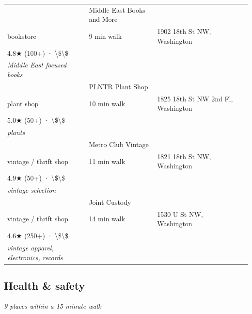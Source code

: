 \documentclass[11pt,a4paper]{article}
\begin{document}
{\begin{longtable}{@{}p{0.5cm}p{6.5cm}p{2.5cm}p{6.5cm}@{}}
\addlinespace[2pt]
12 & Middle East Books and More \\ \textcolor{brandmuted}{\footnotesize bookstore} & 9 min walk & \textcolor{brandmuted}{\footnotesize 1902 18th St NW,  Washington} \\ 4.8★ (100+) · \textbackslash{}\$\textbackslash{}\$ \\ \textit{Middle East focused books} \\
\addlinespace[2pt]
13 & PLNTR Plant Shop \\ \textcolor{brandmuted}{\footnotesize plant shop} & 10 min walk & \textcolor{brandmuted}{\footnotesize 1825 18th St NW 2nd Fl,  Washington} \\ 5.0★ (50+) · \textbackslash{}\$\textbackslash{}\$ \\ \textit{plants} \\
\addlinespace[2pt]
14 & Metro Club Vintage \\ \textcolor{brandmuted}{\footnotesize vintage / thrift shop} & 11 min walk & \textcolor{brandmuted}{\footnotesize 1821 18th St NW,  Washington} \\ 4.9★ (50+) · \textbackslash{}\$\textbackslash{}\$ \\ \textit{vintage selection} \\
\addlinespace[2pt]
15 & Joint Custody \\ \textcolor{brandmuted}{\footnotesize vintage / thrift shop} & 14 min walk & \textcolor{brandmuted}{\footnotesize 1530 U St NW,  Washington} \\ 4.6★ (250+) · \textbackslash{}\$\textbackslash{}\$ \\ \textit{vintage apparel, electronics, records} \\
\bottomrule
\end{longtable}
}
\clearpage

\subsection{Health \& safety}

\noindent\textit{9 places within a 15-minute walk}
\end{document}
